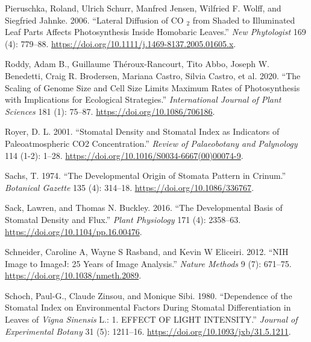 \documentclass[12pt,halfline,a4paper,]{ouparticle}
\newlength{\cslhangindent}
\newlength{\cslentryspacingunit} %
\newenvironment{CSLReferences}[2] %
 {%
  \setlength{\parindent}{0pt}
  \ifodd #1
  \let\oldpar\par
  \def\par{\hangindent=\cslhangindent\oldpar}
  \fi
  \setlength{\parskip}{#2\cslentryspacingunit}
 }%
 {}
\begin{document}
\begin{CSLReferences}{1}{0}
\leavevmode{}%
Pieruschka, Roland, Ulrich Schurr, Manfred Jensen, Wilfried F. Wolff,
and Siegfried Jahnke. 2006. {``Lateral Diffusion of {CO}
\(_{\textrm{2}}\) from Shaded to Illuminated Leaf Parts Affects
Photosynthesis Inside Homobaric Leaves.''} \emph{New Phytologist} 169
(4): 779--88. \url{https://doi.org/10.1111/j.1469-8137.2005.01605.x}.

\leavevmode{}%
Roddy, Adam B., Guillaume Théroux-Rancourt, Tito Abbo, Joseph W.
Benedetti, Craig R. Brodersen, Mariana Castro, Silvia Castro, et al.
2020. {``The {Scaling} of {Genome} {Size} and {Cell} {Size} {Limits}
{Maximum} {Rates} of {Photosynthesis} with {Implications} for
{Ecological} {Strategies}.''} \emph{International Journal of Plant
Sciences} 181 (1): 75--87. \url{https://doi.org/10.1086/706186}.

\leavevmode{}%
Royer, D. L. 2001. {``Stomatal Density and Stomatal Index as Indicators
of Paleoatmospheric {CO2} Concentration.''} \emph{Review of Palaeobotany
and Palynology} 114 (1-2): 1--28.
\url{https://doi.org/10.1016/S0034-6667(00)00074-9}.

\leavevmode{}%
Sachs, T. 1974. {``The {Developmental} {Origin} of {Stomata} {Pattern}
in {Crinum}.''} \emph{Botanical Gazette} 135 (4): 314--18.
\url{https://doi.org/10.1086/336767}.

\leavevmode{}%
Sack, Lawren, and Thomas N. Buckley. 2016. {``The {Developmental}
{Basis} of {Stomatal} {Density} and {Flux}.''} \emph{Plant Physiology}
171 (4): 2358--63. \url{https://doi.org/10.1104/pp.16.00476}.

\leavevmode{}%
Schneider, Caroline A, Wayne S Rasband, and Kevin W Eliceiri. 2012.
{``{NIH} {Image} to {ImageJ}: 25 Years of Image Analysis.''}
\emph{Nature Methods} 9 (7): 671--75.
\url{https://doi.org/10.1038/nmeth.2089}.

\leavevmode{}%
Schoch, Paul-G., Claude Zinsou, and Monique Sibi. 1980. {``Dependence of
the {Stomatal} {Index} on {Environmental} {Factors} During {Stomatal}
{Differentiation} in {Leaves} of \emph{{Vigna} Sinensis} {L}.: 1.
{EFFECT} {OF} {LIGHT} {INTENSITY}.''} \emph{Journal of Experimental
Botany} 31 (5): 1211--16. \url{https://doi.org/10.1093/jxb/31.5.1211}.


\end{CSLReferences}
\end{document}

